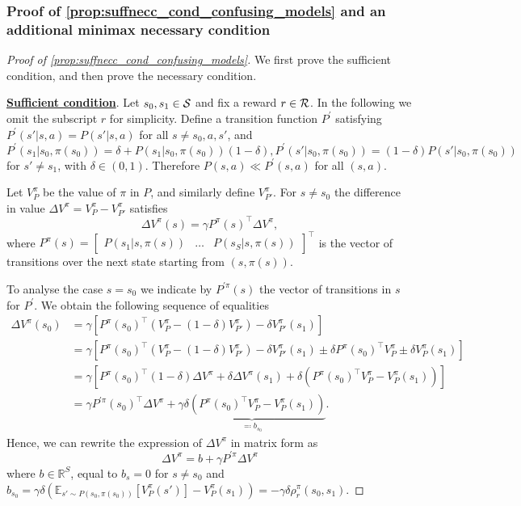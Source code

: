 \subsubsection{Proof of \cref{prop:suffnecc_cond_confusing_models} and an additional minimax necessary condition}
\label{app:prop:suffnecc_cond_confusing_models}
\begin{proof}[Proof of \cref{prop:suffnecc_cond_confusing_models}]

We first prove the sufficient condition, and then prove the necessary condition.

    \underline{\bf Sufficient condition}. Let $s_0,s_1\in {\cal S}$ and fix a reward $r\in {\cal R}$. In the following we omit the subscript $r$ for simplicity.
    Define a transition function $P^{'}$ satisfying $P^{'}(s'|s,a) =P(s'|
s,a)$ for all $s\neq  s_0,a,s'$,  and $P^{'}(s_1|s_0, \pi(s_0))=\delta + P(s_1|s_0,\pi(s_0))(1-\delta),  P^{'}(s'|s_0,\pi(s_0))=(1-\delta)P(s'|s_0,\pi(s_0))$ for $s'\neq s_1$, with $\delta\in (0,1)$. Therefore $P(s,a)\ll P^{'}(s,a)$ for all $(s,a)$.

Let $V_P^\pi$ be the value of $\pi$ in $P$, and similarly define $V_{P'}^\pi$.
For $s\neq s_0$ the difference in value $\Delta V^\pi = V_P^\pi - V_{P'}^\pi$ satisfies
\[
\Delta V^\pi(s) =
        \gamma P^\pi(s)^\top\Delta V^\pi,
\]
where $P^\pi(s)=\begin{bmatrix}
    P(s_1|s,\pi(s))&\dots& P(s_{S}|s,\pi(s))
\end{bmatrix}^\top$ is the vector of transitions over the next state starting from $(s,\pi(s))$.

To analyse the case $s=s_0$ we indicate by $P^{'\pi}(s)$ the vector of transitions in $s$ for $P^{'}$. We obtain the following sequence of equalities
\begin{align*}
    \Delta V^\pi(s_0)&=\gamma[P^\pi(s_0)^\top (V_P^\pi - (1-\delta)V_{P'}^\pi) - \delta V_{P'}^\pi(s_1)]\\
&=\gamma[P^\pi(s_0)^\top (V_P^\pi - (1-\delta)V_{P'}^\pi) - \delta V_{P'}^\pi(s_1) \pm \delta P^\pi(s_0)^\top V_P^\pi \pm \delta V_P^\pi(s_1)]\\&=\gamma[P^\pi(s_0)^\top (1-\delta)\Delta V^\pi + \delta\Delta V^\pi(s_1) + \delta (P^\pi(s_0)^\top V_P^\pi- V_P^\pi(s_1))]\\
    &=\gamma P^{'\pi}(s_0)^\top \Delta V^\pi+\underbrace{\gamma\delta(P^\pi(s_0)^\top V_P^\pi - V_P^\pi(s_1))}_{\eqqcolon b_{s_0}}.
\end{align*}
Hence, we can rewrite the expression of $\Delta V^\pi$ in matrix form as
\[
\Delta V^\pi = b + \gamma P^{'\pi} \Delta V^\pi
\]
where $b\in \mathbb{R}^S$, equal to $b_s=0$ for $s\neq s_0$ and $b_{s_0}=\gamma\delta\left(\mathbb{E}_{s'\sim P(s_0,\pi(s_0))}[V_P^\pi(s')] - V_P^\pi(s_1)\right)=-\gamma\delta \rho_r^\pi(s_0,s_1)$.


\end{proof}
